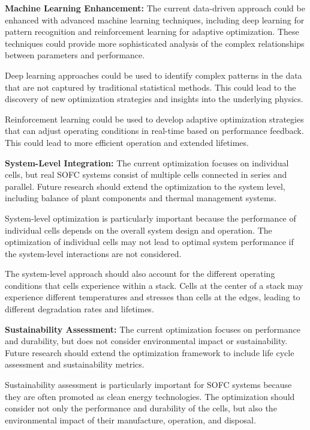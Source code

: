 \documentclass[conference]{IEEEtran}
\begin{document}
\textbf{Machine Learning Enhancement:} The current data-driven approach could be enhanced with advanced machine learning techniques, including deep learning for pattern recognition and reinforcement learning for adaptive optimization. These techniques could provide more sophisticated analysis of the complex relationships between parameters and performance.

Deep learning approaches could be used to identify complex patterns in the data that are not captured by traditional statistical methods. This could lead to the discovery of new optimization strategies and insights into the underlying physics.

Reinforcement learning could be used to develop adaptive optimization strategies that can adjust operating conditions in real-time based on performance feedback. This could lead to more efficient operation and extended lifetimes.

\textbf{System-Level Integration:} The current optimization focuses on individual cells, but real SOFC systems consist of multiple cells connected in series and parallel. Future research should extend the optimization to the system level, including balance of plant components and thermal management systems.

System-level optimization is particularly important because the performance of individual cells depends on the overall system design and operation. The optimization of individual cells may not lead to optimal system performance if the system-level interactions are not considered.

The system-level approach should also account for the different operating conditions that cells experience within a stack. Cells at the center of a stack may experience different temperatures and stresses than cells at the edges, leading to different degradation rates and lifetimes.

\textbf{Sustainability Assessment:} The current optimization focuses on performance and durability, but does not consider environmental impact or sustainability. Future research should extend the optimization framework to include life cycle assessment and sustainability metrics.

Sustainability assessment is particularly important for SOFC systems because they are often promoted as clean energy technologies. The optimization should consider not only the performance and durability of the cells, but also the environmental impact of their manufacture, operation, and disposal.
\end{document}
